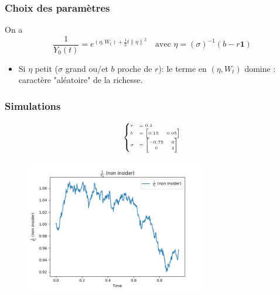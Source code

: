 \documentclass{beamer}
\begin{document}
\begin{frame}
\frametitle{Choix des paramètres}
\par On a 
\begin{displaymath}
\frac{1}{Y_0 \left( t \right)} = e^{ \left( \eta, W_{t} \right) + \frac{1}{2} t {\| \eta \|}^{2}} \quad \text{avec } \eta = (\sigma)^{-1} (b - r \textbf{1})
\end{displaymath}
\begin{itemize}
\item Si $\eta$ petit ($\sigma$ grand ou/et $b$ proche de $r$): le terme en $\left( \eta, W_{t} \right)$ domine : caractère "aléatoire" de la richesse.
\end{itemize}
\end{frame}

\begin{frame}
\frametitle{Simulations}
\begin{figure}[H]
\begin{minipage}{.15\textwidth}
\begin{displaymath}
\tiny
\begin{cases}
r &= 0.1 \\
b &= \begin{bmatrix}
		0.15 & 0.05
	\end{bmatrix} \\
\sigma &= \begin{bmatrix}
			-0.75 & 0 \\
			0 & 1
		  \end{bmatrix}
\end{cases}
\end{displaymath}
\end{minipage}%
\begin{minipage}{.85\textwidth}
  \centering
    \includegraphics[width=0.7\textwidth]{images/simulation_3/wealth_non_insider.png}
\end{minipage}
\end{figure}
\end{frame}
\end{document}
